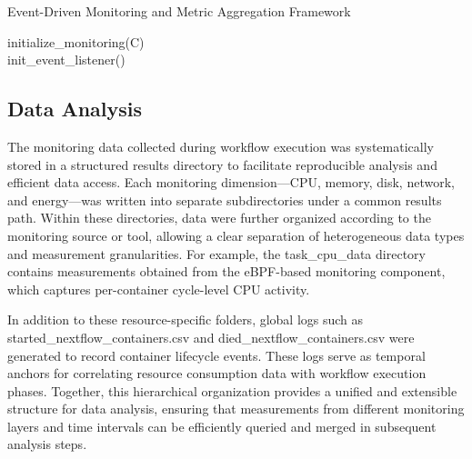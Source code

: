 \begin{algorithm}[H]
    \caption{Event-Driven Monitoring and Metric Aggregation Framework}
    \label{alg:monitoring}

    \BlankLine
    initialize\_monitoring(C)\\
    init\_event\_listener()\\
\end{algorithm}

\subsection{Data Analysis}
\label{sec:data_analysis}
The monitoring data collected during workflow execution was systematically stored in a structured results directory to facilitate reproducible analysis and efficient data access. Each monitoring dimension—CPU, memory, disk, network, and energy—was written into separate subdirectories under a common results path. Within these directories, data were further organized according to the monitoring source or tool, allowing a clear separation of heterogeneous data types and measurement granularities. For example, the task_cpu_data directory contains measurements obtained from the eBPF-based monitoring component, which captures per-container cycle-level CPU activity.

In addition to these resource-specific folders, global logs such as started_nextflow_containers.csv and died_nextflow_containers.csv were generated to record container lifecycle events. These logs serve as temporal anchors for correlating resource consumption data with workflow execution phases. Together, this hierarchical organization provides a unified and extensible structure for data analysis, ensuring that measurements from different monitoring layers and time intervals can be efficiently queried and merged in subsequent analysis steps.

